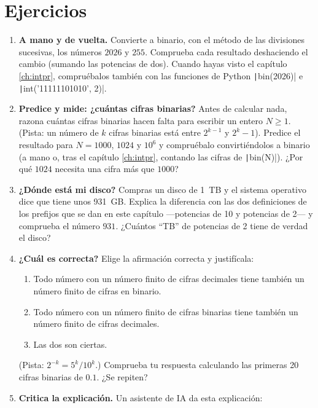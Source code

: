 \section{Ejercicios}
\begin{enumerate}
\item \label{ej:intro_binario} \textbf{A mano y de vuelta.} Convierte a binario, con el método de las divisiones sucesivas, los números $2026$ y $255$. Comprueba cada resultado deshaciendo el cambio (sumando las potencias de dos). Cuando hayas visto el capítulo \ref{ch:intpr}, compruébalos también con las funciones de Python \texttt|bin(2026)| e \texttt|int('11111101010', 2)|.

\item \label{ej:intro_cifras} \textbf{Predice y mide: ¿cuántas cifras binarias?} Antes de calcular nada, razona cuántas cifras binarias hacen falta para escribir un entero $N\geq1$. (Pista: un número de $k$ cifras binarias está entre $2^{k-1}$ y $2^k-1$). Predice el resultado para $N=1000$, $1024$ y $10^6$ y compruébalo convirtiéndolos a binario (a mano o, tras el capítulo \ref{ch:intpr}, contando las cifras de \texttt|bin(N)|). ¿Por qué $1024$ necesita una cifra más que $1000$?

\item \label{ej:intro_disco} \textbf{¿Dónde está mi disco?} Compras un disco de 1~TB y el sistema operativo dice que tiene unos 931~GB. Explica la diferencia con las dos definiciones de los prefijos que se dan en este capítulo ---potencias de 10 y potencias de 2--- y comprueba el número $931$. ¿Cuántos ``TB'' de potencias de 2 tiene de verdad el disco?

\item \label{ej:intro_cual} \textbf{¿Cuál es correcta?} Elige la afirmación correcta y justifícala:
\begin{enumerate}
\item Todo número con un número finito de cifras decimales tiene también un número finito de cifras en binario.
\item Todo número con un número finito de cifras binarias tiene también un número finito de cifras decimales.
\item Las dos son ciertas.
\end{enumerate}
(Pista: $2^{-k}=5^k/10^k$.) Comprueba tu respuesta calculando las primeras 20 cifras binarias de $0.1$. ¿Se repiten?

\item \label{ej:intro_ia} \textbf{Critica la explicación.} Un asistente de IA da esta explicación:


\end{enumerate}
